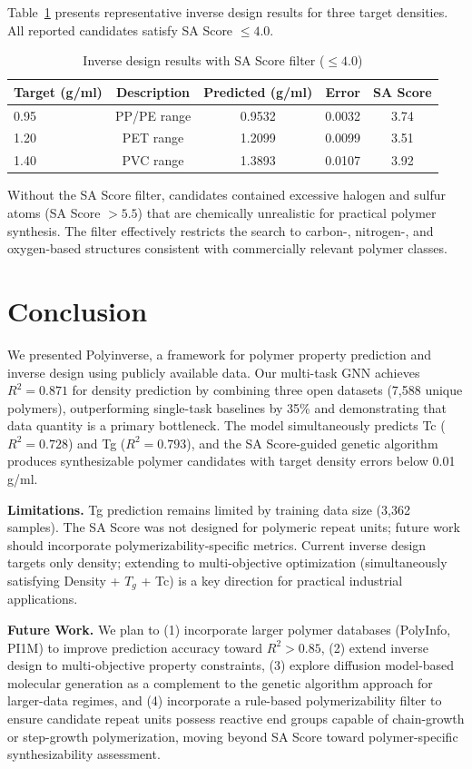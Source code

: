 \documentclass{article}
\begin{document}
Table~\ref{tab:inverse} presents representative inverse design results for
three target densities. All reported candidates satisfy SA Score $\leq 4.0$.

\begin{table}[h]
\centering
\caption{Inverse design results with SA Score filter ($\leq 4.0$)}
\label{tab:inverse}
\begin{tabular}{lcccc}
\toprule
Target (g/ml) & Description & Predicted (g/ml) & Error & SA Score \\
\midrule
0.95 & PP/PE range & 0.9532 & 0.0032 & 3.74 \\
1.20 & PET range   & 1.2099 & 0.0099 & 3.51 \\
1.40 & PVC range   & 1.3893 & 0.0107 & 3.92 \\
\bottomrule
\end{tabular}
\end{table}

Without the SA Score filter, candidates contained excessive halogen and
sulfur atoms (SA Score $> 5.5$) that are chemically unrealistic for
practical polymer synthesis. The filter effectively restricts the search
to carbon-, nitrogen-, and oxygen-based structures consistent with
commercially relevant polymer classes.

\section{Conclusion}

We presented Polyinverse, a framework for polymer property prediction
and inverse design using publicly available data.
Our multi-task GNN achieves $R^2 = 0.871$ for density prediction by combining
three open datasets (7,588 unique polymers), outperforming single-task baselines
by 35\% and demonstrating that data quantity is a primary bottleneck.
The model simultaneously predicts Tc ($R^2=0.728$) and Tg ($R^2=0.793$),
and the SA Score-guided genetic algorithm produces synthesizable polymer
candidates with target density errors below 0.01 g/ml.

\noindent\textbf{Limitations.}
Tg prediction remains limited by training data size (3,362 samples).
The SA Score was not designed for polymeric repeat units; future work
should incorporate polymerizability-specific metrics.
Current inverse design targets only density; extending to
multi-objective optimization (simultaneously satisfying Density + $T_g$ + Tc)
is a key direction for practical industrial applications.

\noindent\textbf{Future Work.}
We plan to (1) incorporate larger polymer databases (PolyInfo, PI1M)
to improve prediction accuracy toward $R^2 > 0.85$,
(2) extend inverse design to multi-objective property constraints,
(3) explore diffusion model-based molecular generation as a
complement to the genetic algorithm approach for larger-data regimes, and
(4) incorporate a rule-based polymerizability filter to ensure
candidate repeat units possess reactive end groups capable of
chain-growth or step-growth polymerization, moving beyond SA Score
toward polymer-specific synthesizability assessment.
\end{document}
